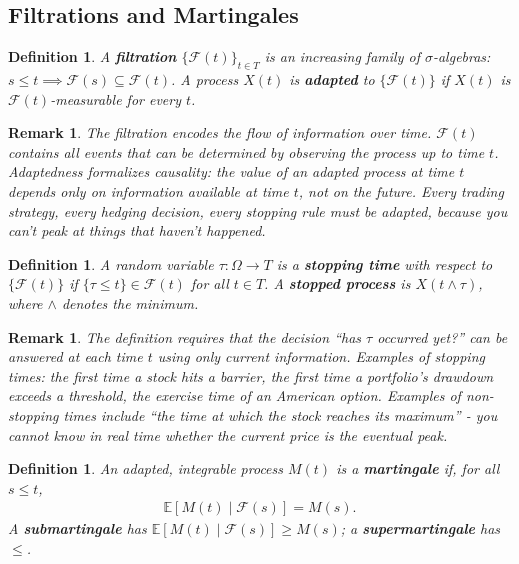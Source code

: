 \documentclass{report}
\theoremstyle{spacedplain}
\theoremstyle{spaceddefinition}
\newtheorem{definition}[theorem]{Definition}
\theoremstyle{spacedremark}
\newtheorem{remark}[theorem]{Remark}
\begin{document}
\subsection{Filtrations and Martingales}

\begin{definition}
A \textbf{filtration} $\{\mathcal{F}(t)\}_{t \in T}$ is an increasing family of $\sigma$-algebras: $s \leq t \implies \mathcal{F}(s) \subseteq \mathcal{F}(t)$. A process $X(t)$ is \textbf{adapted} to $\{\mathcal{F}(t)\}$ if $X(t)$ is $\mathcal{F}(t)$-measurable for every $t$.
\end{definition}

\begin{remark}
The filtration encodes the flow of information over time. $\mathcal{F}(t)$ contains all events that can be determined by observing the process up to time $t$. Adaptedness formalizes causality: the value of an adapted process at time $t$ depends only on information available at time $t$, not on the future. Every trading strategy, every hedging decision, every stopping rule must be adapted, because you can't peak at things that haven't happened.
\end{remark}

\begin{definition}
A random variable $\tau: \Omega \to T$ is a \textbf{stopping time} with respect to $\{\mathcal{F}(t)\}$ if $\{\tau \leq t\} \in \mathcal{F}(t)$ for all $t \in T$. A \textbf{stopped process} is $X(t \wedge \tau)$, where $\wedge$ denotes the minimum.
\end{definition}

\begin{remark}
The definition requires that the decision ``has $\tau$ occurred yet?'' can be answered at each time $t$ using only current information. Examples of stopping times: the first time a stock hits a barrier, the first time a portfolio's drawdown exceeds a threshold, the exercise time of an American option. Examples of non-stopping times include ``the time at which the stock reaches its maximum'' - you cannot know in real time whether the current price is the eventual peak.
\end{remark}

\begin{definition}
An adapted, integrable process $M(t)$ is a \textbf{martingale} if, for all $s \leq t$,
\begin{align}
    \mathbb{E}[M(t) \mid \mathcal{F}(s)] = M(s).
\end{align}
A \textbf{submartingale} has $\mathbb{E}[M(t) \mid \mathcal{F}(s)] \geq M(s)$; a \textbf{supermartingale} has $\leq$.
\end{definition}
\end{document}
